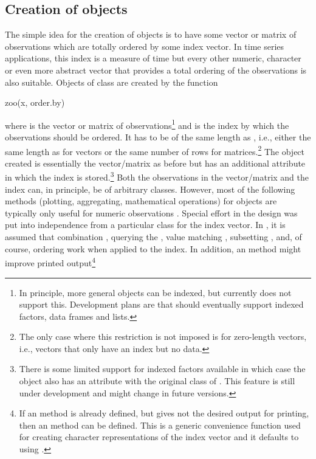 \documentclass{Z}
\begin{document}
\subsection[Creation of "zoo" objects]{Creation of  objects}
\label{sec:zoo}

The simple idea for the creation of  objects is to have
some vector or matrix of observations  which are totally ordered
by some index vector. In time series applications, this index is a measure of
time but every other numeric, character or even more abstract vector that
provides a total ordering of the observations is also suitable. Objects
of class  are created by the function
\begin{Scode}
zoo(x, order.by)
\end{Scode}
where  is the vector or matrix of observations\footnote{In principle,
more general objects can be indexed, but currently  does not support this.
Development plans are that  should eventually support indexed factors,
data frames and lists.} and 
is the index by which the observations should be ordered. It has to be
of the same length as , i.e., either the same length as 
for vectors or the same number of rows for matrices.\footnote{The only case
where this restriction is not imposed is for zero-length vectors, i.e., vectors
that only have an index but no data.} The  object
created is essentially the vector/matrix as before but has an additional
 attribute in which the index is stored.\footnote{There is some
limited support for indexed factors available in which case the 
object also has an attribute  with the original class
of . This feature is still under development and might change in future
versions.} Both the observations in the vector/matrix 
and the index  can, in principle, be of arbitrary classes. However, most of the
following methods (plotting, aggregating, mathematical operations) for 
objects are typically only useful for numeric observations . Special
effort in the design was put into independence from a particular class for
the index vector. In , it is assumed that combination ,
querying the , value matching , subsetting \code{[,},
and, of course, ordering  work when applied to the index. 
In addition, an  method might improve printed output\footnote{If
an  method is already defined, but gives not the desired
output for printing, then an  method can be defined. This is a
generic convenience function used for creating character representations of the
index vector and it defaults to using .}
\end{document}
